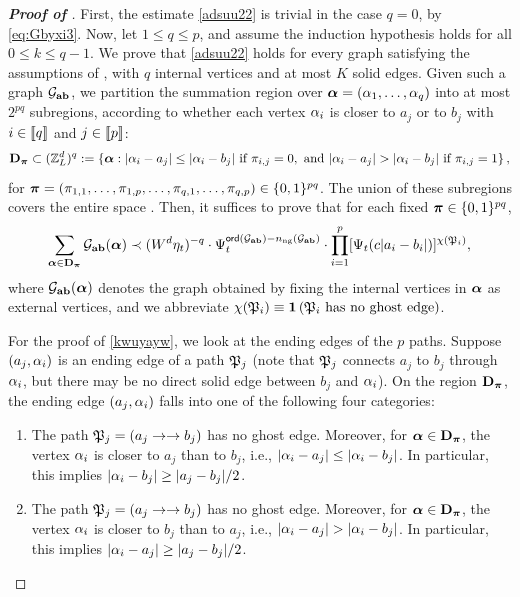 \begin{proof}[\bf Proof of ]
First, the estimate \eqref{adsuu22} is trivial in the case $q=0$, by \eqref{eq:Gbyxi3}. Now, let $1\le q\le p$, and assume the induction hypothesis holds for all $0\le k \le q-1$. We prove that \eqref{adsuu22} holds for every graph satisfying the assumptions of , with $q$ internal vertices and at most $K$ solid edges.
Given such a graph $\mathcal G_{{\mathbf{a}}{\mathbf{b}}}$, we partition the summation region over ${\boldsymbol{\alpha}}=(\alpha_1,\ldots,\alpha_q)$ into at most $2^{pq}$ subregions, according to whether each vertex $\alpha_i$ is closer to $a_j$ or to $b_j$ with $i\in\llbracket{q}\rrbracket$ and $j\in \llbracket{p}\rrbracket$:
\[ {\mathbf{D}}_{{\boldsymbol{\pi}}}\subset ({\mathbb Z}_L^d)^q:=\left\{{\boldsymbol{\alpha}}: |\alpha_i-a_j|\le |\alpha_i-b_j| \ \text{if}\ \pi_{i,j}=0, \text{ and } |\alpha_i-a_j| > |\alpha_i-b_j| \ \text{if}\ \pi_{i,j}=1\right\},\]
for ${\boldsymbol{\pi}}=(\pi_{1,1},\ldots, \pi_{1,p},\ldots, \pi_{q,1},\ldots, \pi_{q,p}) \in \{0,1\}^{pq}$. The union of these subregions covers the entire space . Then, it suffices to prove that for each fixed ${\boldsymbol{\pi}} \in \{0,1\}^{pq}$,  
\begin{align}\label{kwuyayw}
        \sum_{{\boldsymbol{\alpha}}\in {\mathbf{D}}_{{\boldsymbol{\pi}}}} \mathcal G_{{\mathbf{a}}{\mathbf{b}}}({\boldsymbol{\alpha}}) \prec (W^d\eta_t)^{-q}\cdot \Psi_t^{{\mathsf{ord}}(\mathcal G_{{\mathbf{a}}{\mathbf{b}}})-n_{\mathrm{ng}}(\mathcal G_{{\mathbf{a}}{\mathbf{b}}})}\cdot \prod_{i=1}^p  [\Psi_t(c|a_i-b_i|)]^{\chi(\mathfrak{P}_i)} ,
    \end{align} 
where $\mathcal G_{{\mathbf{a}}{\mathbf{b}}}({\boldsymbol{\alpha}})$ denotes the graph obtained by fixing the internal vertices in ${\boldsymbol{\alpha}}$ as external vertices, and we abbreviate $\chi(\mathfrak{P}_i)\equiv \mathbf{1}\left(\mathfrak{P}_i \text{ has no ghost edge}\right)$. 

For the proof of \eqref{kwuyayw}, we look at the ending edges of the $p$ paths. Suppose $(a_j,\alpha_i)$ is an ending edge of a path $\mathfrak{P}_j$ (note that $\mathfrak{P}_j$ connects $a_j$ to $b_j$ through $\alpha_i$, but there may be no direct solid edge between $b_j$ and $\alpha_i$). On the region ${\mathbf{D}}_{{\boldsymbol{\pi}}}$, the ending edge $(a_j,\alpha_i)$ falls into one of the following four categories: 
\begin{enumerate}
    \item[{\bf A1}:] The path $\mathfrak{P}_j=(a_j\to \to b_j)$ has no ghost edge. Moreover, for ${\boldsymbol{\alpha}}\in {\mathbf{D}}_{{\boldsymbol{\pi}}}$, the vertex $\alpha_i$ is closer to $a_j$ than to $b_j$, i.e., $|\alpha_i-a_j|\le  |\alpha_i-b_j|$. In particular, this implies $|\alpha_i-b_j|\ge |a_j-b_j|/2$. 
    
    \item[{\bf A2}:] The path $\mathfrak{P}_j=(a_j\to \to b_j)$ has no ghost edge. Moreover, for ${\boldsymbol{\alpha}}\in {\mathbf{D}}_{{\boldsymbol{\pi}}}$, the vertex $\alpha_i$ is closer to $b_j$ than to $a_j$, i.e., $|\alpha_i-a_j| > |\alpha_i-b_j|$. In particular, this implies $|\alpha_i-a_j|\ge |a_j-b_j|/2$. 
    

\end{enumerate}
\end{proof}

